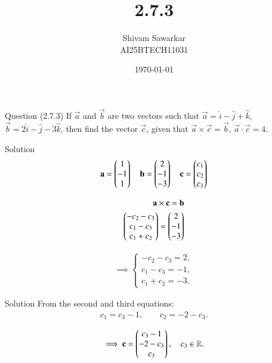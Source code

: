 \documentclass{beamer}
\title %
{2.7.3}
\date{\today}
\author %
{Shivam Sawarkar \\ AI25BTECH11031}
\begin{document}
\frame{\titlepage}
\begin{frame}{Question (2.7.3)}
If $\vec{a}$ and $\vec{b}$ are two vectors such that $\vec{a} = \hat{i} - \hat{j} + \hat{k}$, $\vec{b} = 2\hat{i} - \hat{j} - 3\hat{k}$, then find the vector $\vec{c}$, given that $\vec{a} \times \vec{c} = \vec{b}$, $\vec{a} \cdot \vec{c} = 4$.
\end{frame}

\begin{frame}{Solution}
\begin{align}
\mathbf{a} = \begin{pmatrix}1 \\ -1 \\ 1\end{pmatrix} \quad 
\mathbf{b} = \begin{pmatrix}2 \\ -1 \\ -3\end{pmatrix} \quad 
\mathbf{c} = \begin{pmatrix}c_1 \\ c_2 \\ c_3\end{pmatrix}
\end{align}

\begin{align}
\mathbf{a}\times\mathbf{c} = \mathbf{b} \\ 
\begin{pmatrix}-c_2 -c_3 \\ c_1-c_3 \\ c_1 + c_2\end{pmatrix}=\begin{pmatrix}2 \\ -1 \\ -3\end{pmatrix}
\end{align}


\begin{align}
\implies 
\begin{cases}
-c_2-c_3 = 2,\\
c_1-c_3 = -1,\\
c_1+c_2 = -3.
\end{cases}
\end{align}
\end{frame}

\begin{frame}{Solution}
    From the second and third equations:
\begin{align}
c_1 = c_3 - 1, \qquad c_2 = -2 - c_3.
\end{align}

\begin{align}
\implies 
\mathbf{c} = \begin{pmatrix}c_3-1 \\ -2-c_3 \\ c_3\end{pmatrix}, \quad c_3\in\mathbb{R}.
\end{align}
\end{frame}
\end{document}
